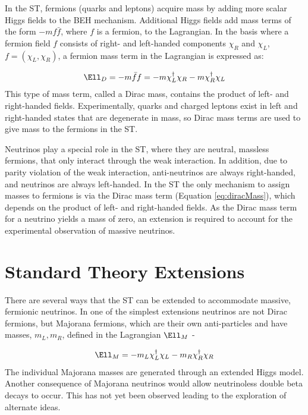 In the ST, fermions (quarks and leptons) acquire mass by adding more scalar Higgs fields to the 
BEH mechanism.  Additional Higgs fields add mass terms of the form $-mf\bar{f}$, where $f$ is a fermion, to 
the Lagrangian.  In the basis where a fermion field $f$ consists of right- and left-handed components $\chi_{R}$ 
and $\chi_{L}$, $f = (\chi_{L},\chi_{R})$, a fermion mass term in the Lagrangian is expressed as:

\begin{equation}
	\Ell_{D} = -m\bar{f}f = -m\chi^{\dagger}_{L}\chi_{R} - m\chi^{\dagger}_{R}\chi_{L}
	\label{eq:diracMass}
\end{equation}
This type of mass term, called a Dirac mass, contains the product of left- and right-handed fields.  Experimentally, 
quarks and charged leptons exist in left and right-handed states that are degenerate 
in mass, so Dirac mass terms are used to give mass to the fermions in the ST.

Neutrinos play a special role in the ST, where they are neutral, massless fermions, that only interact 
through the weak interaction.  In addition, due to parity violation of the weak interaction, 
anti-neutrinos are always right-handed, and neutrinos are always left-handed.  In the ST the only mechanism 
to assign masses to fermions is via the Dirac mass term (Equation \ref{eq:diracMass}), which depends on the 
product of left- and right-handed fields.  As the Dirac mass term for a neutrino yields a mass of zero, an 
extension is required to account for the experimental observation of massive neutrinos.


\section{Standard Theory Extensions}
\label{sec:lrsExtensions}
There are several ways that the ST can be extended to accommodate massive, fermionic neutrinos.  In one of the 
simplest extensions neutrinos are not Dirac fermions, but Majorana fermions, which are their own anti-particles 
and have masses, $m_{L},m_{R}$, defined in the Lagrangian $\Ell_{M}$ -

\begin{equation}
	\Ell_{M} = -m_{L}\chi^{\dagger}_{L}\chi_{L} - m_{R}\chi^{\dagger}_{R}\chi_{R}
\end{equation}
The individual Majorana masses are generated through an extended Higgs model.  Another consequence of Majorana 
neutrinos would allow neutrinoless double beta decays to occur.  This has not yet been observed \cite{igexDblBetaDecay,gerdaDblBetaDecay} 
leading to the exploration of alternate ideas.

